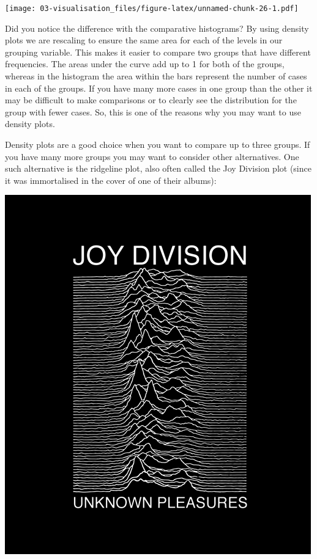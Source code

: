 \documentclass[]{book}
\theoremstyle{definition}
\theoremstyle{definition}
\theoremstyle{definition}
\theoremstyle{remark}
\begin{document}
\texttt{[image: 03-visualisation\_files/figure-latex/unnamed-chunk-26-1.pdf]}

Did you notice the difference with the comparative histograms? By using
density plots we are rescaling to ensure the same area for each of the
levels in our grouping variable. This makes it easier to compare two
groups that have different frequencies. The areas under the curve add up
to 1 for both of the groups, whereas in the histogram the area within
the bars represent the number of cases in each of the groups. If you
have many more cases in one group than the other it may be difficult to
make comparisons or to clearly see the distribution for the group with
fewer cases. So, this is one of the reasons why you may want to use
density plots.

Density plots are a good choice when you want to compare up to three
groups. If you have many more groups you may want to consider other
alternatives. One such alternative is the ridgeline plot, also often
called the Joy Division plot (since it was immortalised in the cover of
one of their albums):

\includegraphics{imgs/joydivision.png}
\end{document}
